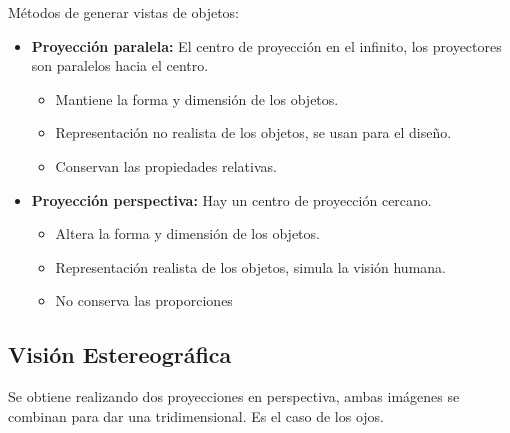 Métodos de generar vistas de objetos:
\begin{itemize}
    \item \textbf{Proyección paralela:} El centro de proyección en el infinito, los proyectores son paralelos hacia el centro.
    \begin{itemize}
        \item Mantiene la forma y dimensión de los objetos.
        \item Representación no realista de los objetos, se usan para el diseño.
        \item Conservan las propiedades relativas.
    \end{itemize}
    \begin{figure}[H]
        {\def\svgwidth{.5\textwidth}
            }
    \end{figure}
    \item \textbf{Proyección perspectiva:} Hay un centro de proyección cercano.
    \begin{itemize}
        \item Altera la forma y dimensión de los objetos.
        \item Representación realista de los objetos, simula la visión humana.
        \item No conserva las proporciones
    \end{itemize}
    \vspace{-5cm}
    \begin{figure}[H]
        {\def\svgwidth{.5\textwidth}
            }
    \end{figure}
\end{itemize}

\subsection{Visión Estereográfica}
Se obtiene realizando dos proyecciones en perspectiva, ambas imágenes se combinan para dar una tridimensional. Es el caso de los ojos.

